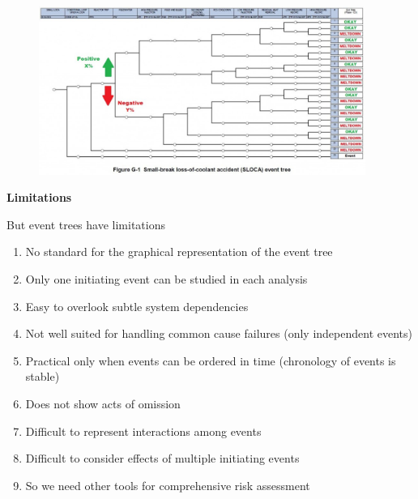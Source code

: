 \documentclass[aspectratio=1610,pdftex,dvipsnames,compress,xcolor={dvipsnames}]{beamer}
\begin{document}
\addtocounter{framenumber}{-1}
\begin{frame}{}
    \begin{figure}
        \centering
        \includegraphics[width=0.95\textwidth]{event.tree_loca.jpg}
    \end{figure}
\end{frame}


\begin{frame}[plain]{}
    \centering\LARGE\textbf{Limitations}
\end{frame}


\addtocounter{framenumber}{-1}
\begin{frame}{But event trees have limitations}
    \begin{enumerate}[series=outerlist,topsep=0pt,itemsep=11pt,leftmargin=*,label=(\arabic*)]
        \item[]No standard for the graphical representation of the event tree
        \item[]Only one initiating event can be studied in each analysis
        \item[]Easy to overlook subtle system dependencies
        \item[]Not well suited for handling common cause failures (only independent events)
        \item[]Practical only when events can be ordered in time (chronology of events is stable) 
        \item[]Does not show acts of omission
        \item[]Difficult to represent interactions among events  
        \item[]Difficult to consider effects of multiple initiating events
        \item[]So we need other tools for comprehensive risk assessment
    \end{enumerate}
\end{frame}
\end{document}
